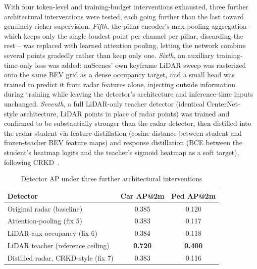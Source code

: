 \documentclass[conference]{IEEEtran}
\begin{document}
With four token-level and training-budget interventions exhausted, three further architectural interventions were
tested, each going further than the last toward genuinely richer supervision. \emph{Fifth}, the pillar encoder's
max-pooling aggregation -- which keeps only the single loudest point per channel per pillar, discarding the rest
-- was replaced with learned attention pooling, letting the network combine several points gradedly rather than
keep only one. \emph{Sixth}, an auxiliary training-time-only loss was added: nuScenes' own keyframe LiDAR sweep
was rasterized onto the same BEV grid as a dense occupancy target, and a small head was trained to predict it from
radar features alone, injecting outside information during training while leaving the detector's architecture and
inference-time inputs unchanged. \emph{Seventh}, a full LiDAR-only teacher detector (identical CenterNet-style
architecture, LiDAR points in place of radar points) was trained and confirmed to be substantially stronger than
the radar detector, then distilled into the radar student via feature distillation (cosine distance between
student and frozen-teacher BEV feature maps) and response distillation (BCE between the student's heatmap logits
and the teacher's sigmoid heatmap as a soft target), following CRKD~\cite{song2024crkd}.

\begin{table}[htbp]
\centering
\caption{Detector AP under three further architectural interventions}
\label{tab:detfixes}
\begin{tabular}{lcc}
\toprule
Detector & Car AP@2m & Ped AP@2m \\
\midrule
Original radar (baseline) & 0.385 & 0.120 \\
Attention-pooling (fix 5) & 0.383 & 0.117 \\
LiDAR-aux occupancy (fix 6) & 0.384 & 0.118 \\
LiDAR teacher (reference ceiling) & \textbf{0.720} & \textbf{0.400} \\
Distilled radar, CRKD-style (fix 7) & 0.383 & 0.116 \\
\bottomrule
\end{tabular}
\end{table}
\end{document}
